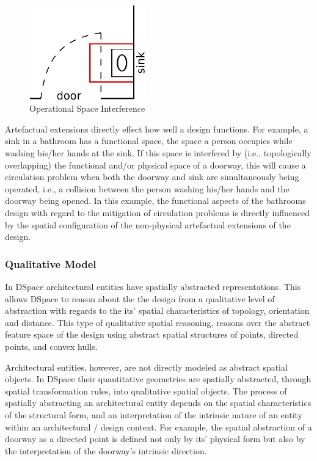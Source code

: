\documentclass[12pt]{ucthesis}
\begin{document}
\begin{figure}[H]
\centering
\includegraphics[width=50mm]{door-sink}
\caption{Operational Space Interference}
\label{door-sink}
\end{figure}

Artefactual extensions directly effect how well a design functions. For example, a sink in a bathroom has a functional space, the space a person occupies while washing his/her hands at the sink. If this space is interfered by (i.e., topologically overlapping) the functional and/or physical space of a doorway, this will cause a circulation problem when both the doorway and sink are simultaneously being operated, i.e., a collision between the person washing his/her hands and the doorway being opened. In this example, the functional aspects of the bathrooms design with regard to the mitigation of circulation problems is directly influenced by the spatial configuration of the non-physical artefactual extensions of the design. 

\subsubsection{Qualitative Model}
In DSpace architectural entities have spatially abstracted representations. This allows DSpace to reason about the the design from a qualitative level of abstraction with regards to the its' spatial characteristics of topology, orientation and distance. This type of qualitative spatial reasoning, reasons over the abstract feature space of the design using abstract spatial structures of points, directed points, and convex hulls. 

Architectural entities, however, are not directly modeled as abstract spatial objects. In DSpace their quantitative geometries are spatially abstracted, through spatial transformation rules, into qualitative spatial objects. The process of spatially abstracting an architectural entity depends on the spatial characteristics of the structural form, and an interpretation of the intrinsic nature of an entity within an architectural / design context. For example, the spatial abstraction of a doorway as a directed point is defined not only by its' physical form but also by the interpretation of the doorway's intrinsic direction. 
\end{document}
